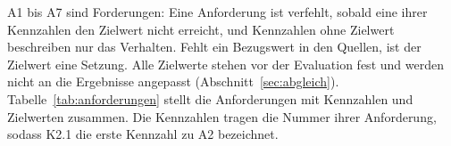 A1 bis A7 sind Forderungen: Eine Anforderung ist verfehlt, sobald eine ihrer Kennzahlen den Zielwert nicht erreicht, und Kennzahlen ohne Zielwert beschreiben nur das Verhalten.
Fehlt ein Bezugswert in den Quellen, ist der Zielwert eine Setzung. Alle Zielwerte stehen vor der Evaluation fest und werden nicht an die Ergebnisse angepasst (Abschnitt~\ref{sec:abgleich}).
Tabelle~\ref{tab:anforderungen} stellt die Anforderungen mit Kennzahlen und Zielwerten zusammen. Die Kennzahlen tragen die Nummer ihrer Anforderung, sodass K2.1 die erste Kennzahl zu A2 bezeichnet.

\begingroup
    \tabstil\setlength{\tabcolsep}{3pt}\setlength{\LTpre}{\medskipamount}\footnotesize
